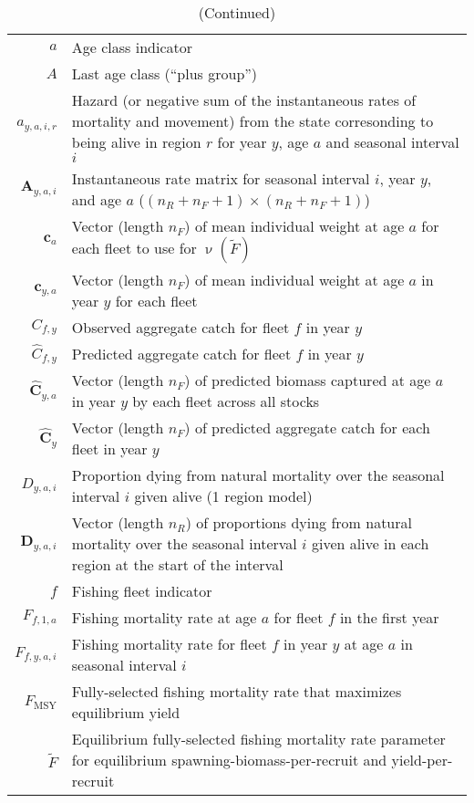 \begin{longtable}[c]{r p{}}
\caption{Definition of terms.\label{symbols}}%
\\ \hline \hline \endfirsthead 
\caption[]{(Continued)} %
\\ \hline \hline \endhead
 \hline \hline \endfoot
$a$ & Age class indicator\\
$A$ & Last age class (``plus group'')\\
$a_{y,a,i,r}$ & Hazard (or negative sum of the instantaneous rates of mortality and movement) from the state corresonding to being alive in region $r$ for year $y$, age $a$ and seasonal interval $i$\\
$\mathbf{A}_{y,a,i}$ & Instantaneous rate matrix for seasonal interval $i$, year $y$, and age $a$ ($(n_R + n_F + 1) \times (n_R + n_F + 1)$)\\
$\mathbf{c}_{a}$ & Vector (length $n_F$) of mean individual weight at age $a$ for each fleet to use for $\upnu(\widetilde{F})$\\
$\mathbf{c}_{y,a}$ & Vector (length $n_F$) of mean individual weight at age $a$ in year $y$ for each fleet\\
$C_{f,y}$ & Observed aggregate catch for fleet $f$ in year $y$\\
$\widehat C_{f,y}$ & Predicted aggregate catch for fleet $f$ in year $y$\\
$\widehat{\mathbf{C}}_{y,a}$ & Vector (length $n_F$) of predicted biomass captured at age $a$ in year $y$ by each fleet across all stocks\\
$\widehat{\mathbf{C}}_y$ & Vector (length $n_F$) of predicted aggregate catch for each fleet in year $y$\\
$D_{y,a,i}$ & Proportion dying from natural mortality over the seasonal interval $i$ given alive (1 region model)\\
$\mathbf{D}_{y,a,i}$ & Vector (length $n_R$) of proportions dying from natural mortality over the seasonal interval $i$ given alive  in each region at the start of the interval\\
$f$ & Fishing fleet indicator\\
$F_{f,1,a}$ & Fishing mortality rate at age $a$ for fleet $f$ in the first year\\
$F_{f,y,a,i}$ & Fishing mortality rate for fleet $f$ in year $y$ at age $a$ in seasonal interval $i$\\
$F_{\text{MSY}}$ & Fully-selected fishing mortality rate that maximizes equilibrium yield\\
$\widetilde{F}$ & Equilibrium fully-selected fishing mortality rate parameter for equilibrium spawning-biomass-per-recruit and yield-per-recruit\\

\end{longtable}
